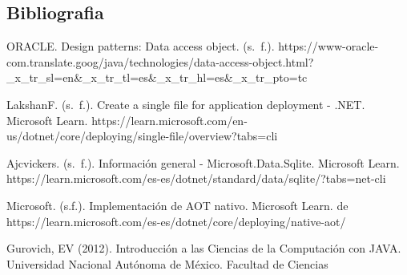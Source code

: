 \documentclass[12pt,letterpaper]{article}
\begin{document}
\subsection{Bibliografia}
ORACLE. Design patterns: Data access object. (s. f.). https://www-oracle-com.translate.goog/java/technologies/data-access-object.html?_x_tr_sl=en&_x_tr_tl=es&_x_tr_hl=es&_x_tr_pto=tc

LakshanF. (s. f.). Create a single file for application deployment - .NET. Microsoft Learn. https://learn.microsoft.com/en-us/dotnet/core/deploying/single-file/overview?tabs=cli

Ajcvickers. (s. f.). Información general - Microsoft.Data.Sqlite. Microsoft Learn. https://learn.microsoft.com/es-es/dotnet/standard/data/sqlite/?tabs=net-cli

Microsoft. (s.f.). Implementación de AOT nativo. Microsoft Learn.  de https://learn.microsoft.com/es-es/dotnet/core/deploying/native-aot/

Gurovich, EV (2012). Introducción a las Ciencias de la Computación con JAVA. Universidad Nacional Autónoma de México. Facultad de Ciencias
\end{document}
